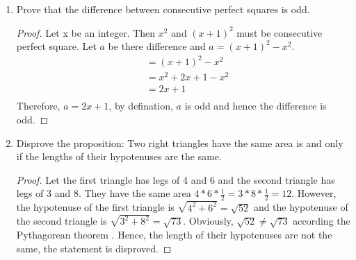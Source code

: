 \documentclass[12pt]{article}
\begin{document}
\begin{enumerate}
	\item Prove that the difference between consecutive perfect squares is odd.
	\begin{proof}
		Let x be an integer. Then $x^2$ and $(x+1)^2$ must be consecutive perfect square. Let $a$ be there difference and $a = (x+1)^2-x^2$. 
		\begin{align*}
			&= (x+1)^2-x^2 \\
			&=  x^2 + 2x+1-x^2\\
			&= 2x+1\\
		\end{align*}
		Therefore, $a=2x+1$, by defination, $a$ is odd and hence the difference is odd. 
	\end{proof}
	\item Disprove the proposition: Two right triangles have the same area is and only if the lengths of their hypotenuses are the same.
	\begin{proof}
		Let the first triangle has legs of 4 and 6 and the second triangle has legs of 3 and 8. They have the same area $4*6*\frac{1}{2} = 3*8*\frac{1}{2} = 12$. However, the hypotenuse of the first triangle is $\sqrt{4^2+6^2} =\sqrt{52}$ and the hypotenuse of the second triangle is $\sqrt{3^2+8^2} =\sqrt{73}.$ Obviously, $\sqrt{52} \ne \sqrt{73}$ according the Pythagorean theorem . Hence, the length of their hypotenuses are not the same, the statement is disproved. 
	\end{proof}

\end{enumerate}
\end{document}
